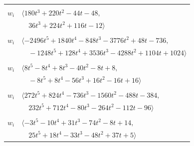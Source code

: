 \documentclass[11pt]{article}
\begin{document}
\begin{longtable}{@{}ll@{}}
\addlinespace[2pt]
\multicolumn{2}{@{}p{0.97\textwidth}@{}}{$i=11$, $D_i=16$, $\rho_{ij}$: $0{:}2, \allowbreak 3{:}2, \allowbreak 20{:}2, \allowbreak 22{:}1, \allowbreak 28{:}1, \allowbreak 43{:}1, \allowbreak 45{:}1, \allowbreak 55{:}2, \allowbreak 61{:}1$}\\
$w_i$ & $\langle 180t^{3}+220t^{2}-44t-48,$\\
 & $\quad 36t^{3}+224t^{2}+116t-12\rangle$\\
\addlinespace[2pt]
\multicolumn{2}{@{}p{0.97\textwidth}@{}}{$i=12$, $D_i=8$, $\rho_{ij}$: $0{:}1, \allowbreak 2{:}1, \allowbreak 13{:}1, \allowbreak 14{:}1, \allowbreak 16{:}1, \allowbreak 20{:}2, \allowbreak 21{:}1, \allowbreak 26{:}2, \allowbreak 27{:}1, \allowbreak 29{:}2, \allowbreak 31{:}2, \allowbreak 37{:}1, \allowbreak 39{:}1, \allowbreak 42{:}2, \allowbreak 46{:}1, \allowbreak 53{:}1, \allowbreak 54{:}1, \allowbreak 62{:}2$}\\
$w_i$ & $\langle -2496t^{5}+1840t^{4}-848t^{3}-3776t^{2}+48t-736,$\\
 & $\quad -1248t^{5}+128t^{4}+3536t^{3}-4288t^{2}+1104t+1024\rangle$\\
\addlinespace[2pt]
\multicolumn{2}{@{}p{0.97\textwidth}@{}}{$i=13$, $D_i=8$, $\rho_{ij}$: $12{:}2, \allowbreak 28{:}1, \allowbreak 40{:}2, \allowbreak 59{:}2, \allowbreak 60{:}2$}\\
$w_i$ & $\langle 8t^{5}-8t^{4}+8t^{3}-40t^{2}-8t+8,$\\
 & $\quad -8t^{5}+8t^{4}-56t^{3}+16t^{2}-16t+16\rangle$\\
\addlinespace[2pt]
\multicolumn{2}{@{}p{0.97\textwidth}@{}}{$i=14$, $D_i=8$, $\rho_{ij}$: $2{:}2, \allowbreak 7{:}1, \allowbreak 10{:}1, \allowbreak 12{:}2, \allowbreak 20{:}2, \allowbreak 26{:}2, \allowbreak 27{:}1, \allowbreak 31{:}1, \allowbreak 43{:}1, \allowbreak 45{:}2, \allowbreak 54{:}1, \allowbreak 55{:}2, \allowbreak 63{:}1$}\\
$w_i$ & $\langle 272t^{5}+824t^{4}-736t^{3}-1560t^{2}-488t-384,$\\
 & $\quad 232t^{5}+712t^{4}-80t^{3}-264t^{2}-112t-96\rangle$\\
\addlinespace[2pt]
\multicolumn{2}{@{}p{0.97\textwidth}@{}}{$i=15$, $D_i=1$, $\rho_{ij}$: $2{:}1, \allowbreak 8{:}2, \allowbreak 10{:}2, \allowbreak 27{:}1, \allowbreak 28{:}2, \allowbreak 41{:}2, \allowbreak 42{:}1, \allowbreak 60{:}1, \allowbreak 63{:}1$}\\
$w_i$ & $\langle -3t^{5}-10t^{4}+31t^{3}-74t^{2}-8t+14,$\\
 & $\quad 25t^{5}+18t^{4}-33t^{3}-48t^{2}+37t+5\rangle$\\

\end{longtable}
\end{document}
